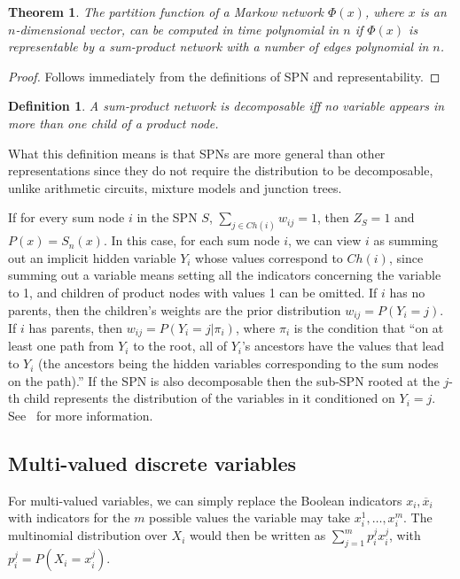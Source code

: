 \documentclass[a4paper,10pt]{article}
\theoremstyle{plain}
\newtheorem*{spn-def}{Definition}
\newtheorem*{spn-thm}{Theorem}
\begin{document}
\begin{spn-thm}
  The partition function of a Markow network $\Phi(x)$, where $x$ is an $n$-dimensional vector, can
  be computed in time polynomial in $n$ if $\Phi(x)$ is representable by a sum-product network with
  a number of edges polynomial in $n$.
\end{spn-thm}

\begin{proof}
  Follows immediately from the definitions of SPN and representability.
\end{proof}

\begin{spn-def}
  A sum-product network is decomposable iff no variable appears in more than one child of a product
  node.
\end{spn-def}

What this definition means is that SPNs are more general than other representations since they do
not require the distribution to be decomposable, unlike arithmetic circuits, mixture models and
junction trees.

If for every sum node $i$ in the SPN $S$, $\sum_{j\in Ch(i)}w_{ij}=1$, then $Z_S=1$ and $P(x)=
S_n(x)$. In this case, for each sum node $i$, we can view $i$ as summing out an implicit hidden
variable $Y_i$ whose values correspond to $Ch(i)$, since summing out a variable means setting all
the indicators concerning the variable to 1, and children of product nodes with values 1 can be
omitted. If $i$ has no parents, then the children's weights are the prior distribution $w_{ij}=
P(Y_i=j)$. If $i$ has parents, then $w_{ij}=P(Y_i=j|\pi_i)$, where $\pi_i$ is the condition that
``on at least one path from $Y_i$ to the root, all of $Y_i$'s ancestors have the values that lead
to $Y_i$ (the ancestors being the hidden variables corresponding to the sum nodes on the path).''
\cite{poon-domingos} If the SPN is also decomposable then the sub-SPN rooted at the $j$-th child
represents the distribution of the variables in it conditioned on $Y_i=j$. See~\cite{poon-domingos}
for more information.


\subsection{Multi-valued discrete variables}

For multi-valued variables, we can simply replace the Boolean indicators $x_i,\overline{x}_i$ with
indicators for the $m$ possible values the variable may take $x_i^1,\ldots,x_i^m$. The multinomial
distribution over $X_i$ would then be written as $\sum_{j=1}^m p_i^j x_i^j$, with $p_i^j=
P(X_i=x_i^j)$.
\end{document}
